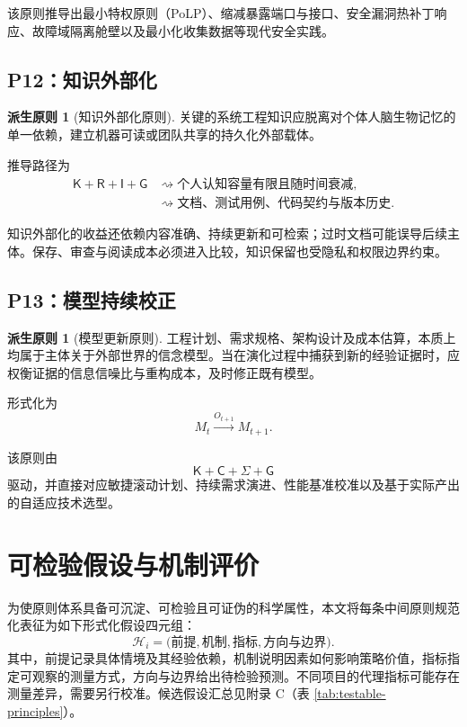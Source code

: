 \documentclass[11pt,a4paper]{ctexart}
\numberwithin{equation}{section}
\theoremstyle{definition}
\newtheorem{principle}[definition]{派生原则}
\theoremstyle{plain}
\newcommand{\Know}{\mathsf{K}}
\newcommand{\Res}{\mathsf{R}}
\newcommand{\Ctrl}{\mathsf{C}}
\newcommand{\Info}{\mathsf{I}}
\newcommand{\Goal}{\mathsf{G}}
\newcommand{\Learn}{\Sigma}
\begin{document}
该原则推导出最小特权原则（PoLP）、缩减暴露端口与接口、安全漏洞热补丁响应、故障域隔离舱壁以及最小化收集数据等现代安全实践。

\subsection{P12：知识外部化}

\begin{principle}[知识外部化原则]
关键的系统工程知识应脱离对个体人脑生物记忆的单一依赖，建立机器可读或团队共享的持久化外部载体。
\end{principle}

推导路径为
\[
\begin{aligned}
\Know+\Res+\Info+\Goal
&\rightsquigarrow
\text{个人认知容量有限且随时间衰减},\\
&\rightsquigarrow
\text{文档、测试用例、代码契约与版本历史}.
\end{aligned}
\]


知识外部化的收益还依赖内容准确、持续更新和可检索；过时文档可能误导后续主体。保存、审查与阅读成本必须进入比较，知识保留也受隐私和权限边界约束。

\subsection{P13：模型持续校正}

\begin{principle}[模型更新原则]
工程计划、需求规格、架构设计及成本估算，本质上均属于主体关于外部世界的信念模型。当在演化过程中捕获到新的经验证据时，应权衡证据的信息信噪比与重构成本，及时修正既有模型。
\end{principle}

形式化为
\[
M_t\xrightarrow{O_{t+1}}M_{t+1}.
\]

该原则由
\[
\Know+\Ctrl+\Learn+\Goal
\]
驱动，并直接对应敏捷滚动计划、持续需求演进、性能基准校准以及基于实际产出的自适应技术选型。

\section{可检验假设与机制评价}
\label{sec:testable-hypotheses}

为使原则体系具备可沉淀、可检验且可证伪的科学属性，本文将每条中间原则规范化表征为如下形式化假设四元组：
\[
\mathcal{H}_i=
\bigl(
\text{前提},\text{机制},\text{指标},\text{方向与边界}
\bigr).
\]
其中，前提记录具体情境及其经验依赖，机制说明因素如何影响策略价值，指标指定可观察的测量方式，方向与边界给出待检验预测。不同项目的代理指标可能存在测量差异，需要另行校准。候选假设汇总见附录 C（表 \ref{tab:testable-principles}）。
\end{document}
